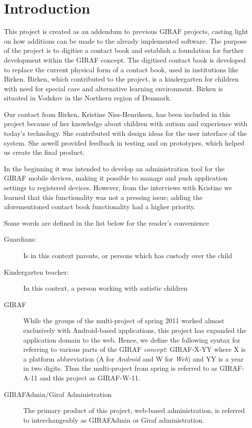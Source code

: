 \chapter{Introduction}


This project is created as an addendum to previous GIRAF projects, casting light on how additions can be made to the already implemented software.
The purpose of the project is to digitise a contact book and establish a foundation for further development within the GIRAF concept.
The digitised contact book is developed to replace the current physical form of a contact book, used in institutions like Birken.
Birken, which contributed to the project, is a kindergarten for children with need for special care and alternative learning environment. Birken is situated in Vodskov in the Northern region of Denmark.

Our contact from Birken, Kristine Niss-Henriksen, has been included in this project because of her knowledge about children with autism and experience with today's technology. She contributed with design ideas for the user interface of the system. She aswell provided feedback in testing and on prototypes, which helped us create the final product.

In the beginning it was intended to develop an administration tool for the GIRAF mobile devices, making it possible to manage and push application settings to registered devices. However, from the interviews with Kristine we learned that this functionality was not a pressing issue; adding the aforementioned contact book functionality had a higher priority.  

Some words are defined in the list below for the reader's convenience
\begin{description}
\item[Guardians:] Is in this context parents, or persons which has custody over the child
\item[Kindergarten teacher:] In this context, a person working with autistic children
\item[GIRAF] While the groups of the multi-project of spring 2011 worked almost exclusively with Android-based applications, this project has expanded the application domain to the web. Hence, we define the following syntax for referring to various parts of the GIRAF \emph{concept}: GIRAF-X-YY where X is a platform abbreviation (A for \emph{Android} and W for \emph{Web}) and YY is a year in two digits. Thus the multi-project from spring is referred to as GIRAF-A-11 and this project as GIRAF-W-11.
\item[GIRAFAdmin/Giraf Administration] The primary product of this project, web-based administration, is referred to interchangeably as GIRAFAdmin or Giraf administration.
\end{description}


